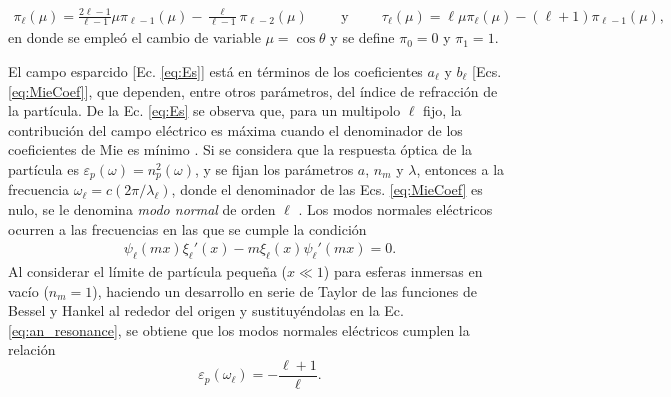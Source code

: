 \documentclass[letterpaper,11pt] {article}
\newcommand{\beqhalf}{\noindent \begin{minipage}[c]{. 5\linewidth} \begin{equation}}
\newcommand{\eeqhalf}{\end{equation} \end{minipage} }
\newcommand{\eqhalf}[1]{\beqhalf #1 \eeqhalf}
\begin{document}
	\begin{align*}
	\pi_\ell(\mu) = \frac{2\ell-1}{\ell-1} \mu \pi_{\ell-1}(\mu) - \frac{\ell}{\ell-1}\pi_{\ell-2}(\mu)
	\hspace{1cm}\mbox{y}\hspace{1cm}
	\tau_\ell(\mu) = \ell \mu\pi_\ell(\mu) - (\ell+1)\pi_{\ell-1}(\mu),
	\end{align*}
%
en donde se empleó el cambio de variable $\mu = \cos\theta$ y se define   $\pi_0 =0 $ y $\pi_1 = 1$. 
	
	El campo esparcido [Ec.  \eqref{eq:Es}] está en términos de los coeficientes $a_\ell$ y $b_\ell$ [Ecs.  \eqref{eq:MieCoef}], que dependen, entre otros parámetros, del índice de refracción de la partícula.  De la Ec.  \eqref{eq:Es} se observa que, para un multipolo $\ell$ fijo, la contribución del campo eléctrico es máxima cuando el denominador de los coeficientes de Mie es mínimo \cite{novotny2006principles}.  Si se considera que la respuesta óptica de la partícula es 	$\varepsilon_p (\omega) = n_p^2 (\omega)$, y se fijan los parámetros $a$, $n_m$ y $\lambda$, 	entonces a la frecuencia $\omega_\ell = c (2\pi / \lambda_\ell)$, donde el denominador de las Ecs.  \eqref{eq:MieCoef} es nulo, se le denomina \emph{modo normal} de orden $\ell$ \cite{bohren1998absorption,maciel2017momentum}.  Los modos normales eléctricos ocurren a las frecuencias en las que se cumple la condición 
	\begin{align}
	\psi_\ell(mx)\xi_\ell'(x)-m\xi_\ell(x)\psi_\ell'(mx) = 0. 
	\label{eq:an_resonance}
	\end{align}
Al considerar el límite de partícula pequeña ($x\ll 1$) para esferas inmersas en vacío ($n_m=1$), haciendo un desarrollo en serie de Taylor de las funciones de Bessel y Hankel al rededor del origen y sustituyéndolas en la Ec.  \eqref{eq:an_resonance}, se obtiene que los modos normales eléctricos cumplen la relación \cite{maciel2017momentum}
	\begin{equation}
	\varepsilon_p(\omega_\ell) = - \frac{\ell+1}{\ell}.  
	\label{eq:NormalModes}
	\end{equation}
\end{document}
